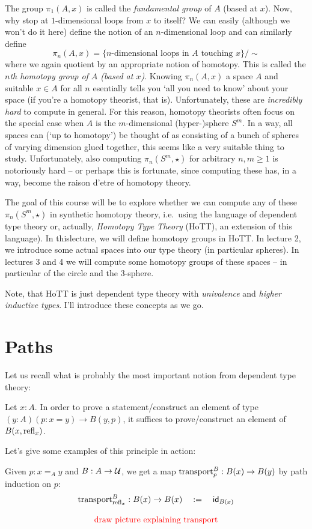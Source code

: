 \documentclass[10pt,oneside,leqno,openright]{memoir}
\begin{document}
The group $\pi_1(A,x)$ is called the \emph{fundamental group} of $A$
(based at $x$). Now, why stop at $1$-dimensional loops from $x$ to
itself? We can easily (although we won't do it here) define the notion
of an $n$-dimensional loop and can similarly define
%
\[\pi_n(A,x) = \{\text{$n$-dimensional loops in $A$ touching $x$}\}/\sim \]
%
where we again quotient by an appropriate notion of homotopy.
%
This is called the \emph{$n$th homotopy group of $A$ (based at $x$)}.
%
Knowing $\pi_n(A,x)$ a space $A$ and suitable $x \in A$ for all $n$ esentially tells you `all you need to know' about your space (if you're a homotopy theorist, that is).
%
Unfortunately, these are \emph{incredibly hard} to compute in general.
%
For this reason, homotopy theorists often focus on the special case when $A$ is the $m$-dimensional (hyper-)sphere $S^m$.
%
In a way, all spaces can (`up to homotopy') be thought of as consisting of a bunch of spheres of varying dimension glued together, this seems like a very suitable thing to study.
%
Unfortunately, also computing $\pi_n(S^m,\star)$ for arbitrary $n,m \geq 1$ is notoriously hard -- or perhaps this is fortunate, since computing these has, in a way, become the raison d'etre of homotopy theory.

The goal of this course will be to explore whether we can compute any of these $\pi_n(S^m,\star)$ in synthetic homotopy theory, i.e.\ using the language of dependent type theory or, actually, \emph{Homotopy Type Theory} (HoTT), an extension of this language). In thislecture, we will define homotopy groups in HoTT. In lecture 2, we introduce some actual spaces into our type theory (in particular spheres). In lectures 3 and 4 we will compute some homotopy groups of these spaces -- in particular of the circle and the $3$-sphere.

Note, that HoTT is just dependent type theory with \emph{univalence} and \emph{higher inductive types}. I'll introduce these concepts as we go. 



\section*{Paths}
Let us recall what is probably the most important notion from dependent type theory:
\begin{definition}
  Let $x:A$. In order to prove a statement/construct an element of type $(y:A) (p : x = y) \to B(y,p)$, it suffices to prove/construct an element of $B(x,\mathrm{refl}_x)$.
 \end{definition}
%
Let's give some examples of this principle in action:
%
\begin{example}[Transport]
  Given $p: x =_A y$ and $B:A \to \mathcal{U}$, we get a map $\operatorname{transport}^B_p : B(x) \to B(y)$ by path induction on $p$:
  \[\operatorname{transport}^B_{\mathrm{refl}_{x}} : B(x) \to B (x) \quad := \quad \mathsf{id}_{B(x)}\]
\end{example}
%
\[\text{{\color{red}draw picture explaining transport}}\]
\end{document}
